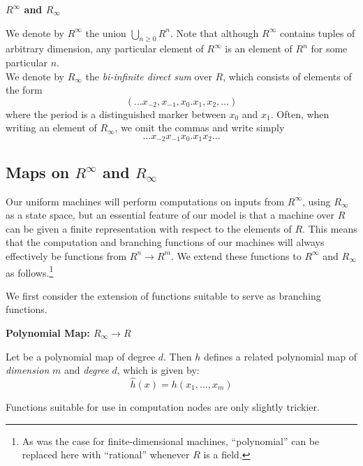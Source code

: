   \begin{definition}{\textbf{$R^\infty$ and $R_\infty$}}

    We denote by $R^\infty$ the union $\bigcup_{n \geq 0} R^n$. Note
    that although $R^\infty$ contains tuples of arbitrary dimension,
    any particular element of $R^\infty$ is an element of $R^n$ for
    some particular $n$.\\

    We denote by $R_\infty$ the \emph{bi-infinite direct sum} over
    $R$, which consists of elements of the form $$(\ldots x_{-2},
    x_{-1}, x_0.x_1, x_2, \ldots)$$ where the period is a
    distinguished marker between $x_0$ and $x_1$.  Often, when writing
    an element of $R_\infty$, we omit the commas and write simply
    $$\ldots x_{-2}x_{-1}x_0.x_1x_2 \ldots$$
  \end{definition}

  \subsection{Maps on $R^\infty$ and $R_\infty$}
    
  Our uniform machines will perform computations on inputs from
  $R^\infty$, using $R_\infty$ as a state space, but an essential
  feature of our model is that a machine over $R$ can be given a
  finite representation with respect to the elements of $R$.  This
  means that the computation and branching functions of our machines
  will always effectively be functions from $R^n \rightarrow R^m$.  We
  extend these functions to $R^\infty$ and $R_\infty$ as
  follows.\footnote{As was the case for finite-dimensional machines,
    ``polynomial'' can be replaced here with ``rational'' whenever $R$
    is a field.}

  We first consider the extension of functions suitable to serve as
  branching functions.  

  \begin{definition}{\textbf{Polynomial Map: $R_\infty \rightarrow R$}}
    
    Let  be a polynomial map of degree $d$.  Then
    $h$ defines a related polynomial map
     of \emph{dimension} $m$ and
    \emph{degree} $d$, which is given by:
    $$\widehat{h}(x) = h(x_1, \ldots, x_m)$$
  \end{definition}

  Functions suitable for use in computation nodes are only slightly
  trickier.  
  
